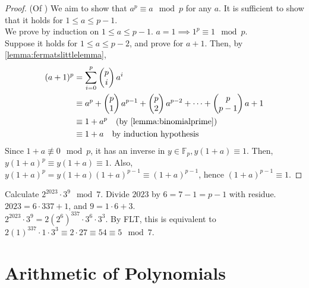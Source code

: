 \documentclass[12pt,oneside]{article}
\begin{document}
\begin{proof}(Of )
  We aim to show that $a^p \equiv a \mod p$ for any $a$. It is sufficient to show that it holds for $1 \leq a \leq p - 1$.\\
  We prove by induction on $1 \leq a \leq p -1$. $a = 1 \implies 1^p \equiv 1 \mod p$.\\ Suppose it holds for $1 \leq a\leq p -2$, and prove for $a+1$. Then, by \cref{lemma:fermatslittlelemma}, \begin{align}
    (a+1)^{p} &= \sum_{i=0}^{p} \begin{pmatrix}
      p\\
      i
    \end{pmatrix}a^{i}\\
    &\equiv a^p + \begin{pmatrix}
      p\\1
    \end{pmatrix}a^{p-1} + \begin{pmatrix}
      p\\2
    \end{pmatrix}a^{p-2} + \cdots + \begin{pmatrix}
      p\\p-1
    \end{pmatrix}a + 1\\
    &\equiv 1 + a^p \quad \text{(by \cref{lemma:binomialprime})}\\
    &\equiv 1 + a\quad \text{by induction hypothesis}
  \end{align}
  Since $1 + a \not\equiv 0 \mod p$, it has an inverse in $y \in \mathbb{F}_p, y(1+a) \equiv 1$. Then, $y(1+a)^p\equiv y(1+a) \equiv 1$. Also, $y(1+a)^p = y(1+a)(1+a)^{p-1} \equiv (1+a)^{p-1}$, hence $(1+a)^{p-1} \equiv 1$.
\end{proof}


\begin{example}
  Calculate $2^{2023} \cdot 3^9 \mod 7$. Divide $2023$ by $6 = 7-1 = p - 1$ with residue. $2023 = 6 \cdot 337 + 1$, and $9 = 1 \cdot 6 + 3$.\\
  $2^{2023} \cdot 3^9 = 2(2^{6})^{337}\cdot 3^6 \cdot 3^3$. By FLT, this is equivalent to $2(1)^{337}\cdot 1 \cdot 3^3 \equiv 2 \cdot 27 \equiv 54 \equiv 5 \mod 7$.
\end{example}


\section{Arithmetic of Polynomials}
\end{document}
